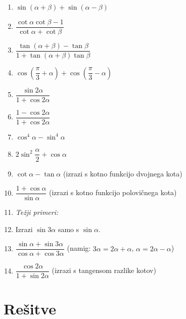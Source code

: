 \documentclass[11pt,a4paper]{article}
\begin{document}
\begin{enumerate}[label=\alph*), itemsep=8pt]
  \item $\sin(\alpha+\beta) + \sin(\alpha-\beta)$
  \item $\dfrac{\cot\alpha\cot\beta - 1}{\cot\alpha + \cot\beta}$
  \item $\dfrac{\tan(\alpha+\beta) - \tan\beta}{1 + \tan(\alpha+\beta)\tan\beta}$
  \item $\cos\left(\dfrac{\pi}{3}+\alpha\right) + \cos\left(\dfrac{\pi}{3}-\alpha\right)$
  \item $\dfrac{\sin 2\alpha}{1+\cos 2\alpha}$
  \item $\dfrac{1-\cos 2\alpha}{1+\cos 2\alpha}$
  \item $\cos^4\alpha - \sin^4\alpha$
  \item $2\sin^2\dfrac{\alpha}{2} + \cos\alpha$
  \item $\cot\alpha - \tan\alpha$ \quad (izrazi s kotno funkcijo dvojnega kota)
  \item $\dfrac{1+\cos\alpha}{\sin\alpha}$ \quad (izrazi s kotno funkcijo polovičnega kota)
  \item[] \textit{Težji primeri:}
  \item Izrazi $\sin 3\alpha$ samo s $\sin\alpha$.
  \item $\dfrac{\sin\alpha + \sin 3\alpha}{\cos\alpha + \cos 3\alpha}$ \quad (namig: $3\alpha = 2\alpha+\alpha$, $\alpha = 2\alpha - \alpha$)
  \item $\dfrac{\cos 2\alpha}{1+\sin 2\alpha}$ \quad (izrazi s tangensom razlike kotov)
\end{enumerate}

\newpage
\section*{Rešitve}
\end{document}
